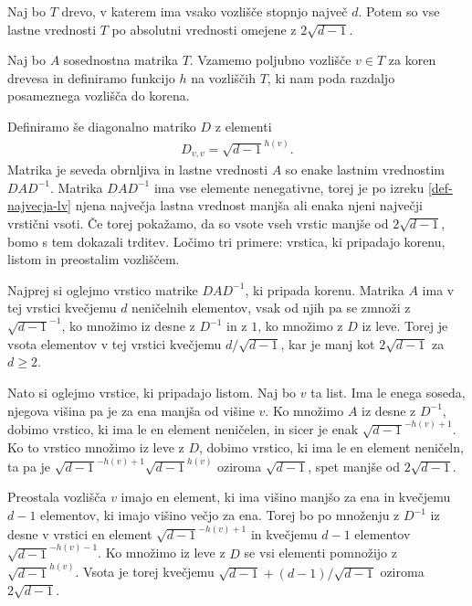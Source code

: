 \begin{izrek}\label{lastne-vrednosti-drevesa}
    Naj bo \(T\) drevo, v katerem ima vsako vozlišče stopnjo največ \(d\). Potem so vse lastne vrednosti \(T\) po absolutni vrednosti omejene z \(2\sqrt{d-1}\).
\end{izrek}
\begin{dokaz}
    Naj bo \(A\) sosednostna matrika \(T\). Vzamemo poljubno vozlišče \(v\in T\) za koren drevesa in definiramo funkcijo \(h\) na vozliščih \(T\), ki nam poda razdaljo posameznega vozlišča do korena.

    Definiramo še diagonalno matriko \(D\) z elementi
    \begin{align*}
        D_{v, v} = \sqrt{d-1}^{h(v)}.
    \end{align*}
    Matrika je seveda obrnljiva in lastne vrednosti \(A\) so enake lastnim vrednostim \(D A D^{-1}\). Matrika \(DAD^{-1}\) ima vse elemente nenegativne, torej je po izreku \ref{def-najvecja-lv} njena največja lastna vrednost manjša ali enaka njeni največji vrstični vsoti. Če torej pokažamo, da so vsote vseh vrstic manjše od \(2\sqrt{d-1}\), bomo s tem dokazali trditev. Ločimo tri primere: vrstica, ki pripadajo korenu, listom in preostalim vozliščem.

    Najprej si oglejmo vrstico matrike \(DAD^{-1}\), ki pripada korenu. Matrika \(A\) ima v tej vrstici kvečjemu \(d\) neničelnih elementov, vsak od njih pa se zmnoži z \(\sqrt{d-1}^{-1}\), ko množimo iz desne z \(D^{-1}\) in z \(1\), ko množimo z \(D\) iz leve. Torej je vsota elementov v tej vrstici kvečjemu \(d/\sqrt{d-1}\), kar je manj kot \(2\sqrt{d-1}\) za \(d\geq 2\).

    Nato si oglejmo vrstice, ki pripadajo listom. Naj bo \(v\) ta list. Ima le enega soseda, njegova višina pa je za ena manjša od višine \(v\). Ko množimo \(A\) iz desne z \(D^{-1}\), dobimo vrstico, ki ima le en element neničelen, in sicer je enak \(\sqrt{d-1}^{-h(v)+1}\). Ko to vrstico množimo iz leve z \(D\), dobimo vrstico, ki ima le en element neničeln, ta pa je \(\sqrt{d-1}^{-h(v)+1}\sqrt{d-1}^{h(v)}\) oziroma \(\sqrt{d-1}\), spet manjše od \(2\sqrt{d-1}\).

    Preostala vozlišča \(v\) imajo en element, ki ima višino manjšo za ena in kvečjemu \(d-1\) elementov, ki imajo višino večjo za ena. Torej bo po množenju z \(D^{-1}\) iz desne v vrstici en element \(\sqrt{d-1}^{-h(v)+1}\) in kvečjemu \(d-1\) elementov \(\sqrt{d-1}^{-h(v)-1}\). Ko množimo iz leve z \(D\) se vsi elementi pomnožijo z \(\sqrt{d-1}^{h(v)}\). Vsota je torej kvečjemu \(\sqrt{d-1} + (d-1)/\sqrt{d-1}\) oziroma \(2\sqrt{d-1}\).
\end{dokaz}

